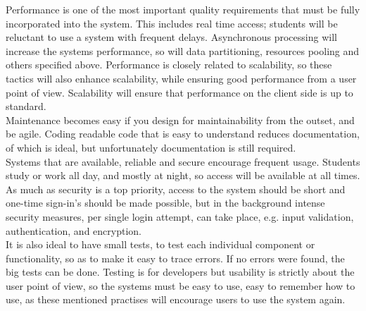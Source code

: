 
%

Performance is one of the most important quality requirements that must be fully incorporated into the system.  This includes real time access; students will be reluctant to use a system with frequent delays. Asynchronous processing will increase the systems performance, so will data partitioning, resources pooling and others specified above.  Performance is closely related to scalability, so these tactics will also enhance scalability, while ensuring good performance from a user point of view. Scalability will ensure that performance on the client side is up to standard.\\
	
Maintenance becomes easy if you design for maintainability from the outset, and be agile.
Coding readable code that is easy to understand reduces documentation, of which is ideal, but unfortunately documentation is still required.\\
 	
Systems that are available, reliable and secure encourage frequent usage.
Students study or work all day, and mostly at night, so access will be available at all times. As much as security is a top priority, access to the system should be short and one-time sign-in’s should be made possible, but in the background intense security measures, per single login attempt, can take place, e.g. input validation, authentication, and encryption.\\

It is also ideal to have small tests, to test each individual component or functionality, so as to make it easy to trace errors. If no errors were found, the big tests can be done. Testing is for developers but usability is strictly about the user point of view, so the systems must be easy to use, easy to remember how to use, as these mentioned practises will encourage users to use the system again.\\

%